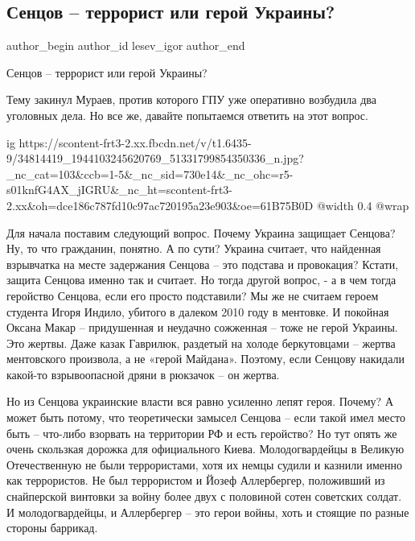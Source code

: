  
 
 
 
 
 
\subsection{Сенцов – террорист или герой Украины?}
\label{sec:08_06_2018.fb.lesev_igor.1.sencov_terrorist_geroj_ukrainy}
 
\ifcmt
 author_begin
   author_id lesev_igor
 author_end
\fi

Сенцов – террорист или герой Украины?

Тему закинул Мураев, против которого ГПУ уже оперативно возбудила два уголовных
дела. Но все же, давайте попытаемся ответить на этот вопрос.

\ifcmt
  ig https://scontent-frt3-2.xx.fbcdn.net/v/t1.6435-9/34814419_1944103245620769_51331799854350336_n.jpg?_nc_cat=103&ccb=1-5&_nc_sid=730e14&_nc_ohc=r5-s01knfG4AX_jIGRU&_nc_ht=scontent-frt3-2.xx&oh=dce186c787fd10c97ac720195a23e903&oe=61B75B0D
  @width 0.4
  @wrap 
\fi

Для начала поставим следующий вопрос. Почему Украина защищает Сенцова? Ну, то
что гражданин, понятно. А по сути? Украина считает, что найденная взрывчатка на
месте задержания Сенцова – это подстава и провокация? Кстати, защита Сенцова
именно так и считает. Но тогда другой вопрос, - а в чем тогда геройство
Сенцова, если его просто подставили? Мы же не считаем героем студента Игоря
Индило, убитого в далеком 2010 году в ментовке. И покойная Оксана Макар –
придушенная и неудачно сожженная – тоже не герой Украины. Это жертвы. Даже
казак Гаврилюк, раздетый на холоде беркутовцами – жертва ментовского произвола,
а не «герой Майдана». Поэтому, если Сенцову накидали какой-то взрывоопасной
дряни в рюкзачок – он жертва.

Но из Сенцова украинские власти вся равно усиленно лепят героя. Почему? А может
быть потому, что теоретически замысел Сенцова – если такой имел место быть –
что-либо взорвать на территории РФ и есть геройство? Но тут опять же очень
скользкая дорожка для официального Киева. Молодогвардейцы в Великую
Отечественную не были террористами, хотя их немцы судили и казнили именно как
террористов. Не был террористом и Йозеф Аллербергер, положивший из снайперской
винтовки за войну более двух с половиной сотен советских солдат. И
молодогвардейцы, и Аллербергер – это герои войны, хоть и стоящие по разные
стороны баррикад.

